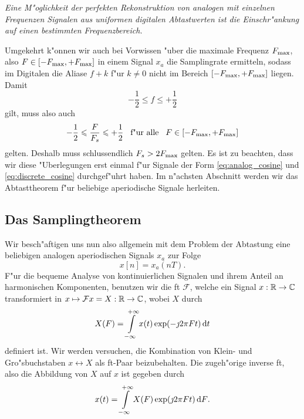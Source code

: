 \emph{Eine M"oglichkeit der perfekten Rekonstruktion von analogen mit einzelnen Frequenzen Signalen aus uniformen digitalen Abtastwerten ist die Einschr"ankung auf einen bestimmten Frequenzbereich.}

Umgekehrt k"onnen wir auch bei Vorwissen "uber die maximale Frequenz $F_{\rm max}$, also $F \in [-F_{\rm max},+F_{\rm max}]$ in einem Signal $x_a$ die Samplingrate ermitteln, sodass im Digitalen die Aliase $f + k$ f"ur $k \neq 0$ nicht im Bereich $[-F_{\rm max},+F_{\rm max}]$ liegen.
Damit
\[
    -\frac 12 \leqslant f \leqslant + \frac 12
\]
gilt, muss also auch
\[
    -\frac 12 \leqslant \frac{F}{F_s} \leqslant + \frac 12 {\hspace{3mm} \text{f"ur alle} \hspace{3mm}} F \in [-F_{\rm max},+F_{\rm max}]
\]
gelten.
Deshalb muss schlussendlich $F_s > 2 F_{\rm max}$ gelten.
Es ist zu beachten, dass wir diese "Uberlegungen erst einmal  f"ur Signale der Form \eqref{eq:analog_cosine} und \eqref{eq:discrete_cosine} durchgef"uhrt haben.
Im n"achsten Abschnitt werden wir das Abtasttheorem f"ur beliebige aperiodische Signale herleiten.
%
%
\subsection{Das Samplingtheorem}
%
Wir besch"aftigen uns nun also allgemein mit dem Problem der Abtastung eine beliebigen analogen aperiodischen Signals $x_a$ zur Folge
\[
    x[n] = x_a(nT).
\]
F"ur die bequeme Analyse von kontinuierlichen Signalen und ihrem Anteil an harmonischen Komponenten, benutzen wir die \gls{ft} $\mathcal{F}$, welche ein Signal $x : \mathbb{R} \rightarrow \mathbb{C}$ transformiert in $x \mapsto \mathcal{F} x = X : \mathbb{R} \rightarrow \mathbb{C}$, wobei $X$ durch
%
\begin{equation}\label{eq:fourier_trafo}
    X(F) = {\int\limits_{-\infty}^{+\infty}{x(t) \exp(-\jmath 2 \pi F t)}\,\mathrm{d}{t}}
\end{equation}
%
definiert ist.
Wir werden versuchen, die Kombination von Klein- und Gro"sbuchstaben $x \leftrightarrow X$ als \gls{ft}-Paar beizubehalten.
Die zugeh"orige inverse \gls{ft}, also die Abbildung von $X$ auf $x$ ist gegeben durch
%
\begin{equation}\label{eq:inv_fourier_trafo}
    x(t) = {\int\limits_{-\infty}^{+\infty}{X(F) \exp(\jmath 2 \pi F t)}\,\mathrm{d}{F}}.
\end{equation}

